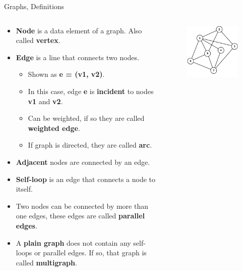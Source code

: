 \documentclass[aspectratio=169]{beamer}%
\begin{document}
\begin{frame}{Graphs, Definitions}%
    \begin{columns}[T]%
        \begin{column}{.66\textwidth}%
            \begin{itemize}
                \item \textbf{Node} is a data element of a graph. Also called \textbf{vertex}.
                \item \textbf{Edge} is a line that connects two nodes.
                    \begin{itemize}
                        \item Shown as \textbf{ e = (v1, v2)}.
                        \item In this case, edge \textbf{e} is \textbf{incident} to nodes \textbf{v1} and \textbf{v2}.
                        \item Can be weighted, if so they are called \textbf{weighted edge}.
                        \item If graph is directed, they are called \textbf{arc}.
                    \end{itemize}
                \item \textbf{Adjacent} nodes are connected by an edge.
                \item \textbf{Self-loop} is an edge that connects a node to itself.
                \item Two nodes can be connected by more than one edges, these edges are called \textbf{parallel edges}.
                \item A \textbf{plain graph} does not contain any self-loops or parallel edges. If so, that graph is called \textbf{multigraph}.
            \end{itemize}
        \end{column}%
        \hfill
        \begin{column}{.30\textwidth}%
            \begin{figure}%
                \centering%
                \includegraphics[width=.9\linewidth]{graph1.png}%

\end{figure}
\end{column}
\end{columns}
\end{frame}
\end{document}
